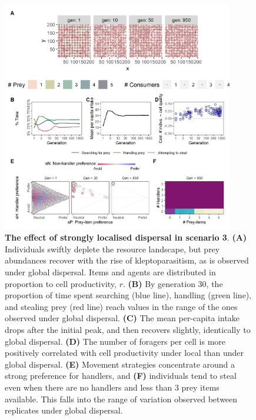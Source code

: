{\begin{figure}
\centering
\includegraphics[width=0.9\textwidth]{figures/kleptomove/fig_local_dispersal_sc_03.png}
\caption{\textbf{The effect of strongly localised dispersal in scenario 3}. \textbf{(A)} Individuals swiftly deplete the resource landscape, but prey abundances recover with the rise of kleptoparasitism, as is observed under global dispersal. Items and agents are distributed in proportion to cell productivity, \(r\). \textbf{(B)} By generation 30, the proportion of time spent searching (blue line), handling (green line), and stealing prey (red line) reach values in the range of the ones observed under global dispersal. \textbf{(C)} The mean per-capita intake drops after the initial peak, and then recovers slightly, identically to global dispersal. \textbf{(D)} The number of foragers per cell is more positively correlated with cell productivity under local than under global dispersal. \textbf{(E)} Movement strategies concentrate around a strong preference for handlers, and \textbf{(F)} individuals tend to steal even when there are no handlers and less than 3 prey items available. This falls into the range of variation observed between replicates under global dispersal.}
\end{figure}

}

